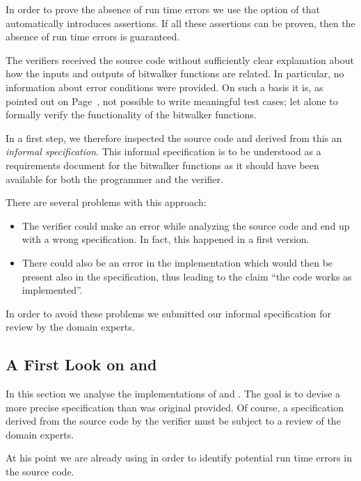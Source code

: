In order to prove the absence of run time errors we use
the  option of \wpframac that automatically introduces \acsl
assertions. If all these assertions can be proven, then
the absence of run time errors is guaranteed.


\begin{framed}
The verifiers received the source code without sufficiently clear explanation
about how the inputs and outputs of bitwalker functions are related.
In particular, no information about error conditions were provided.
On such a basis it is, as pointed out on Page~\pageref{lesson},
not possible to write meaningful test cases;
let alone to formally verify the functionality of the bitwalker functions.

In a first step, we therefore inspected the source code and 
derived from this an \emph{informal specification}.
This informal specification is to be understood
as a requirements document for the bitwalker functions as it should have been
available for both the programmer and the verifier.

There are several problems with this approach:
\begin{itemize}
\item
The verifier could make an error while analyzing the source code
and end up with a wrong specification. 
In fact, this happened in a first version.

\item
There could also be an error in the implementation which would then be present also
in the specification, thus leading to the claim ``the code works as implemented''.
\end{itemize}

In order to avoid these problems we submitted our informal specification
for review by the domain experts.
\end{framed}

\clearpage

\subsection{A First Look on \peek and \poke}

In this section we analyse the implementations of \peek 
and \poke.
The goal is to devise a more precise specification than
was original provided.
Of course, a specification derived from the source code by the verifier
must be subject to a review of the domain experts.

At his point we are already using \framacwp in order to identify
potential run time errors in the source code.

